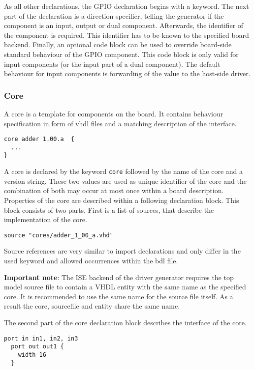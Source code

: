 \documentclass{report}
\begin{document}
As all other declarations, the GPIO declaration begins with a keyword. The next part of the declaration is a direction specifier, telling the generator if the component is an input, output or dual component.
Afterwards, the identifier of the component is required. This identifier has to be known to the specified board backend.
Finally, an optional code block can be used to override board-side standard behaviour of the GPIO component. This code block is only valid for input components (or the input part of a dual component). The default behaviour for input components is forwarding of the value to the host-side driver.

\subsubsection{Core}
A core is a template for components on the board. It contains behaviour specification in form of vhdl files and a matching description of the interface.

\begin{lstlisting}[language=bdl]
core adder 1.00.a  {
  ...
}
\end{lstlisting}

A core is declared by the keyword \texttt{core} followed by the name of the core and a version string. These two values are used as unique identifier of the core and the combination of both may occur at most once within a board description. Properties of the core are described within a following declaration block. This block consists of two parts. First is a list of sources, that describe the implementation of the core.

\begin{lstlisting}[language=bdl]
  source "cores/adder_1_00_a.vhd"
\end{lstlisting}

Source references are very similar to import declarations and only differ in the used keyword and allowed occurrences within the bdl file.

\textbf{Important note}: The ISE backend of the driver generator requires the top model source file to contain a VHDL entity with the same name as the specified core. It is recommended to use the same name for the source file itself. As a result the core, sourcefile and entity share the same name.

The second part of the core declaration block describes the interface of the core.

\begin{lstlisting}[language=bdl]
  port in in1, in2, in3
  port out out1 {
    width 16
  }
\end{lstlisting}
\end{document}
